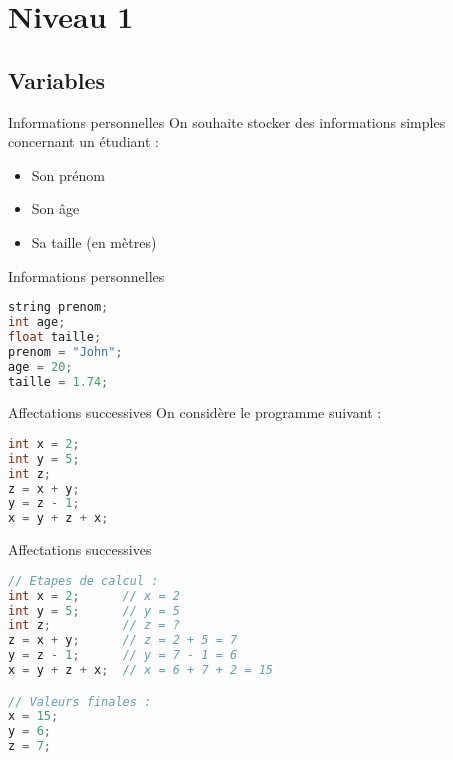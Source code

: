\section{Niveau 1}
\subsection{Variables}
\begin{UPSTIexercice}{Informations personnelles}
    On souhaite stocker des informations simples concernant un étudiant :
    \begin{itemize}
        \item Son prénom
        \item Son âge
        \item Sa taille (en mètres)
    \end{itemize}
\end{UPSTIexercice}

\begin{UPSTIprofOnlyEnv}%
    \begin{UPSTIcorrectionP}{Informations personnelles}
        \begin{lstlisting}[language=c]
string prenom;
int age;
float taille;
prenom = "John";
age = 20;
taille = 1.74;
        \end{lstlisting}
    \end{UPSTIcorrectionP}
\end{UPSTIprofOnlyEnv}

\begin{UPSTIexercice}{Affectations successives}
    On considère le programme suivant :
    \begin{lstlisting}[language=C]
int x = 2;
int y = 5;
int z;
z = x + y;
y = z - 1;
x = y + z + x;
    \end{lstlisting}
\end{UPSTIexercice}

\begin{UPSTIprofOnlyEnv}
    \begin{UPSTIcorrectionP}{Affectations successives}
        \begin{lstlisting}[language=C]
// Etapes de calcul :
int x = 2;      // x = 2
int y = 5;      // y = 5
int z;          // z = ?
z = x + y;      // z = 2 + 5 = 7
y = z - 1;      // y = 7 - 1 = 6
x = y + z + x;  // x = 6 + 7 + 2 = 15

// Valeurs finales :
x = 15;
y = 6;
z = 7;
        \end{lstlisting}
    \end{UPSTIcorrectionP}
\end{UPSTIprofOnlyEnv}


